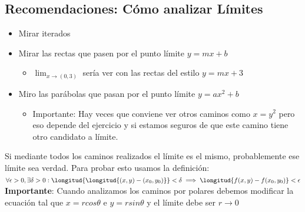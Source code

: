 \documentclass[10pt,a4paper]{article}
\begin{document}
\subsection*{Recomendaciones: Cómo analizar Límites}
\begin{itemize}
    \item Mirar iterados
    \item Mirar las rectas que pasen por el punto límite $y = mx + b$
    \begin{itemize}
        \item $\lim_{x \to (0, 3)}$ sería ver con las rectas del estilo $y=mx+3$
    \end{itemize}
    \item Miro las parábolas que pasan por el punto límite $y=ax^{2} + b$
    \begin{itemize}
        \item Importante: Hay veces que conviene ver otros caminos como $x=y^{2}$ pero eso depende del ejercicio y si estamos seguros de que este camino tiene otro candidato a límite. 
    \end{itemize}
\end{itemize}
Si mediante todos los caminos realizados el límite es el mismo, probablemente ese límite sea verdad. Para probar esto usamos la definición: $\forall \epsilon > 0, \exists \delta > 0 : \longitud{\longitud{(x,y) - (x_{0}, y_{0})}} < \delta \implies \longitud{f(x, y) - f(x_{0}, y_{0})} < \epsilon $ \\
\textbf{Importante}: Cuando analizamos los caminos por polares debemos modificar la ecuación tal que $x = r cos \theta$ e $ y = r sin \theta$ y el límite debe ser $r \rightarrow 0$ \\
\end{document}
